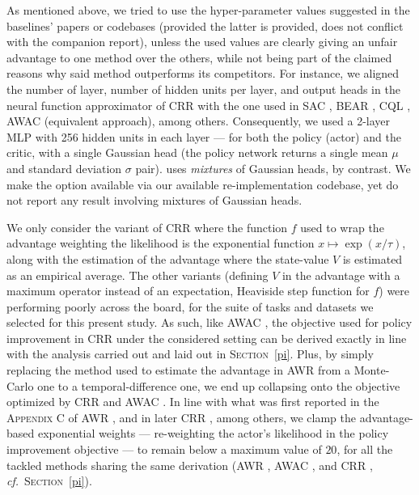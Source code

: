 As mentioned above, we tried to use the hyper-parameter values suggested in the baselines' papers or codebases (provided
the latter is provided, does not conflict with the companion report), unless the used values are clearly
giving an unfair advantage to one method over the others, while not being part of the claimed reasons
why said method outperforms its competitors. For instance, we aligned the number of layer,
number of hidden units per layer,
and output heads in the neural function approximator of CRR \cite{Wang2020-sr}
with the one used in SAC \cite{Haarnoja2018-bm},
BEAR \cite{Kumar2019-rw},
CQL \cite{Kumar2020-zb},
AWAC \cite{Nair2020-gd} (equivalent approach), among others.
Consequently, we used a 2-layer MLP with 256 hidden units in each layer --- for both the policy (actor) and the critic,
with a single Gaussian head (the policy network returns a single mean $\mu$ and standard deviation $\sigma$ pair).
\cite{Wang2020-sr} uses \emph{mixtures} of Gaussian heads, by contrast.
We make the option available via our available re-implementation codebase,
yet do not report any result involving mixtures of Gaussian heads.

We only consider the variant of CRR \cite{Wang2020-sr}
where the function $f$ used to wrap the advantage weighting the likelihood is the exponential function
$x \mapsto \exp(x / \tau)$,
along with the estimation of the advantage where the state-value $V$ is estimated as an empirical average.
The other variants (defining $V$ in the advantage with a maximum operator instead of an expectation,
Heaviside step function for $f$)
were performing poorly across the board, for the suite of tasks and datasets
we selected for this present study.
As such, like AWAC \cite{Nair2020-gd},
the objective used for policy improvement in CRR \cite{Wang2020-sr}
under the considered setting
can be derived exactly in line with the analysis carried out and laid out in \textsc{Section}~\ref{pi}.
Plus, by simply replacing the method used to estimate the advantage in AWR \cite{Peng2019-hu}
from a Monte-Carlo one to a temporal-difference one, we end up collapsing onto the objective optimized by
CRR \cite{Wang2020-sr}
and AWAC \cite{Nair2020-gd}.
In line with what was first reported in the \textsc{Appendix} C of AWR \cite{Peng2019-hu},
and in later CRR \cite{Wang2020-sr},
among others,
we clamp the advantage-based exponential weights
--- re-weighting the actor's likelihood in the policy improvement objective
--- to remain below a maximum value of $20$,
for all the tackled methods sharing the same derivation
(AWR \cite{Peng2019-hu},
AWAC \cite{Nair2020-gd},
and CRR \cite{Wang2020-sr},
\textit{cf.}~\textsc{Section}~\ref{pi}).

